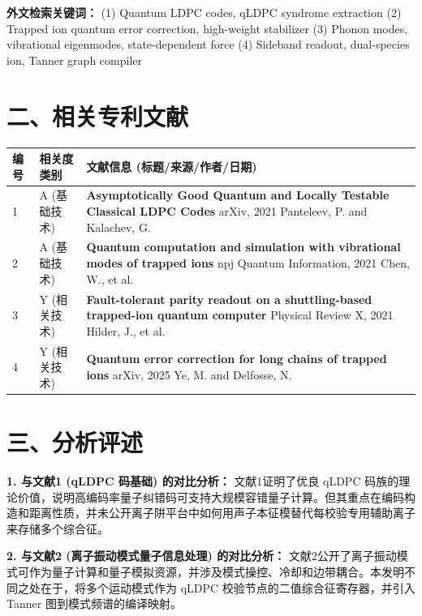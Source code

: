 \documentclass[12pt,a4paper]{article}
\begin{document}
\textbf{外文检索关键词：}
(1) Quantum LDPC codes, qLDPC syndrome extraction
(2) Trapped ion quantum error correction, high-weight stabilizer
(3) Phonon modes, vibrational eigenmodes, state-dependent force
(4) Sideband readout, dual-species ion, Tanner graph compiler

\section*{二、相关专利文献}

\renewcommand{\arraystretch}{1.5}
\begin{longtable}{|p{1.5cm}|p{6cm}|p{7.5cm}|}
\hline
\textbf{编号} & \textbf{相关度类别} & \textbf{文献信息 (标题/来源/作者/日期)} \\
\hline
1 & A (基础技术) & \textbf{Asymptotically Good Quantum and Locally Testable Classical LDPC Codes} \newline arXiv, 2021 \newline Panteleev, P. and Kalachev, G. \\
\hline
2 & A (基础技术) & \textbf{Quantum computation and simulation with vibrational modes of trapped ions} \newline npj Quantum Information, 2021 \newline Chen, W., et al. \\
\hline
3 & Y (相关技术) & \textbf{Fault-tolerant parity readout on a shuttling-based trapped-ion quantum computer} \newline Physical Review X, 2021 \newline Hilder, J., et al. \\
\hline
4 & Y (相关技术) & \textbf{Quantum error correction for long chains of trapped ions} \newline arXiv, 2025 \newline Ye, M. and Delfosse, N. \\
\hline
\end{longtable}

\section*{三、分析评述}

\textbf{1. 与文献1 (qLDPC 码基础) 的对比分析：}
文献1证明了优良 qLDPC 码族的理论价值，说明高编码率量子纠错码可支持大规模容错量子计算。但其重点在编码构造和距离性质，并未公开离子阱平台中如何用声子本征模替代每校验专用辅助离子来存储多个综合征。

\textbf{2. 与文献2 (离子振动模式量子信息处理) 的对比分析：}
文献2公开了离子振动模式可作为量子计算和量子模拟资源，并涉及模式操控、冷却和边带耦合。本发明不同之处在于，将多个运动模式作为 qLDPC 校验节点的二值综合征寄存器，并引入 Tanner 图到模式频谱的编译映射。
\end{document}
